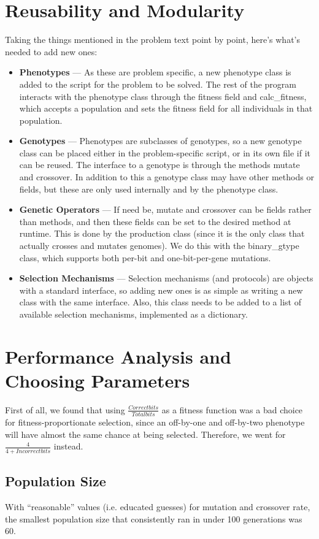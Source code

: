 \documentclass[a4paper,12pt]{article}
\begin{document}
\section{Reusability and Modularity}
Taking the things mentioned in the problem text point by point, here's what's needed to add new ones:
\begin{itemize}
\item{\textbf{Phenotypes} --- As these are problem specific, a new phenotype class is added to the script for the problem to be solved. The rest of the program interacts with the phenotype class through the fitness field and calc\_fitness, which accepts a population and sets the fitness field for all individuals in that population.}
\item{\textbf{Genotypes} --- Phenotypes are subclasses of genotypes, so a new genotype class can be placed either in the problem-specific script, or in its own file if it can be reused. The interface to a genotype is through the methods mutate and crossover. In addition to this a genotype class may have other methods or fields, but these are only used internally and by the phenotype class.}
\item{\textbf{Genetic Operators} --- If need be, mutate and crossover can be fields rather than methods, and then these fields can be set to the desired method at runtime. This is done by the production class (since it is the only class that actually crosses and mutates genomes). We do this with the binary\_gtype class, which supports both per-bit and one-bit-per-gene mutations.}
\item{\textbf{Selection Mechanisms} --- Selection mechanisms (and protocols) are objects with a standard interface, so adding new ones is as simple as writing a new class with the same interface. Also, this class needs to be added to a list of available selection mechanisms, implemented as a dictionary.}
\end{itemize}

\section{Performance Analysis and Choosing Parameters}
First of all, we found that using $\frac{Correct bits}{Total bits}$ as a fitness function was a bad choice for fitness-proportionate selection, since an off-by-one and off-by-two phenotype will have almost the same chance at being selected. Therefore, we went for $\frac{4}{4+Incorrect bits}$ instead. 

\subsection{Population Size}
With ``reasonable'' values (i.e. educated guesses) for mutation and crossover rate, the smallest population size that consistently ran in under 100 generations was 60. 
\end{document}
